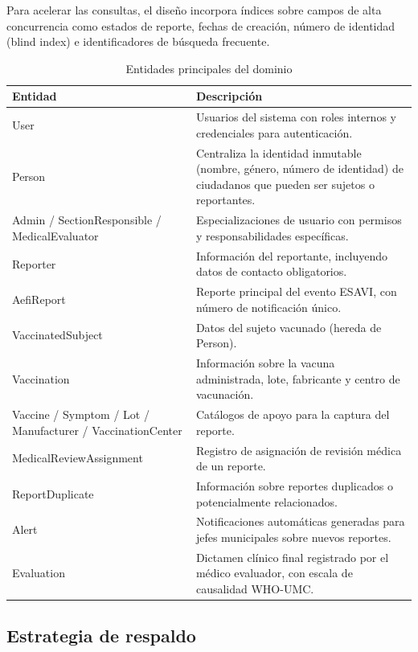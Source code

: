 \documentclass[12pt,letterpaper]{article}
\begin{document}
Para acelerar las consultas, el diseño incorpora índices sobre campos de alta concurrencia como estados de reporte, fechas de creación, número de identidad (blind index) e identificadores de búsqueda frecuente.

\begin{table}[H]
\centering
\caption{Entidades principales del dominio}
\label{tab:entities}
\begin{tabular}{|p{5.8cm}|p{9.2cm}|}
\hline
\textbf{Entidad} & \textbf{Descripción} \\ \hline
User & Usuarios del sistema con roles internos y credenciales para autenticación. \\ \hline
Person & Centraliza la identidad inmutable (nombre, género, número de identidad) de ciudadanos que pueden ser sujetos o reportantes. \\ \hline
Admin / SectionResponsible / MedicalEvaluator & Especializaciones de usuario con permisos y responsabilidades específicas. \\ \hline
Reporter & Información del reportante, incluyendo datos de contacto obligatorios. \\ \hline
AefiReport & Reporte principal del evento ESAVI, con número de notificación único. \\ \hline
VaccinatedSubject & Datos del sujeto vacunado (hereda de Person). \\ \hline
Vaccination & Información sobre la vacuna administrada, lote, fabricante y centro de vacunación. \\ \hline
Vaccine / Symptom / Lot / Manufacturer / VaccinationCenter & Catálogos de apoyo para la captura del reporte. \\ \hline
MedicalReviewAssignment & Registro de asignación de revisión médica de un reporte. \\ \hline
ReportDuplicate & Información sobre reportes duplicados o potencialmente relacionados. \\ \hline
Alert & Notificaciones automáticas generadas para jefes municipales sobre nuevos reportes. \\ \hline
Evaluation & Dictamen clínico final registrado por el médico evaluador, con escala de causalidad WHO-UMC. \\ \hline
\end{tabular}
\end{table}

\subsection{Estrategia de respaldo}
\end{document}
